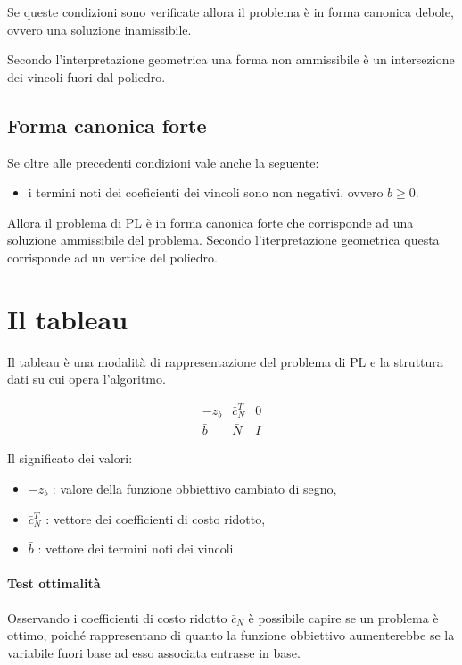 Se queste condizioni sono verificate allora il problema è in forma canonica debole, ovvero una soluzione inamissibile.

Secondo l'interpretazione geometrica una forma non ammissibile è un intersezione dei vincoli fuori dal poliedro.


\subsection{Forma canonica forte}
Se oltre alle precedenti condizioni vale anche la seguente:
\begin{itemize}
	\item i termini noti dei coeficienti dei vincoli sono non negativi, ovvero $\bar{b}\geq\bar{0}$.
\end{itemize}

Allora il problema di PL è in forma canonica forte che corrisponde ad una soluzione ammissibile del problema. Secondo l'iterpretazione geometrica questa corrisponde ad un vertice del poliedro.


\section{Il tableau}
Il tableau è una modalità di rappresentazione del problema di PL e la struttura dati su cui opera l'algoritmo.

\begin{equation}\label{tableau}
	\begin{array}{c|cc}
		-z_b&\bar{c}_N^T&0\\
		\hline
		\bar{b}&\bar{N}&I	 
	\end{array}
\end{equation}

Il significato dei valori:
\begin{itemize}
	\item $-z_b$ : valore della funzione obbiettivo cambiato di segno,
	\item $\bar{c}_N^T$ : vettore dei coefficienti  di costo ridotto,
	\item $\bar{b}$ : vettore dei termini noti dei vincoli.
\end {itemize}


\paragraph{Test ottimalità}
Osservando i coefficienti di costo ridotto $\bar{c}_N$ è possibile capire se un problema è ottimo, poiché rappresentano di quanto la funzione obbiettivo aumenterebbe se la variabile fuori base ad esso associata entrasse in base.

